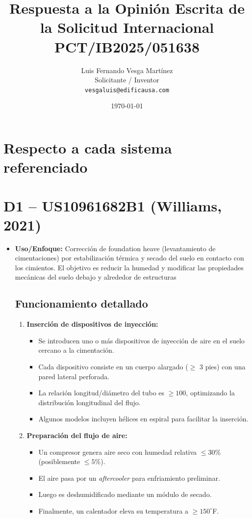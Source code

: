 \documentclass[12pt]{article}
\title{\textbf{Respuesta a la Opinión Escrita de la Solicitud Internacional PCT/IB2025/051638}}
\author{Luis Fernando Vesga Martínez\\Solicitante / Inventor\\\texttt{vesgaluis@edificausa.com}}
\date{\today}
\begin{document}
\maketitle

\section{Respecto a cada sistema referenciado}

\section*{ D1 – US10961682B1 (Williams, 2021)}

\begin{itemize}
    \item \textbf{Uso/Enfoque:} Corrección de foundation heave (levantamiento de cimentaciones) por estabilización térmica y secado del suelo en contacto con los cimientos. El objetivo es reducir la humedad y modificar las propiedades mecánicas del suelo debajo y alrededor de estructuras
    \subsection*{Funcionamiento detallado}

    \begin{enumerate}
        \item \textbf{Inserción de dispositivos de inyección:}
        \begin{itemize}
            \item Se introducen uno o más dispositivos de inyección de aire en el suelo cercano a la cimentación.
            \item Cada dispositivo consiste en un cuerpo alargado (\(\geq\) 3 pies) con una pared lateral perforada.
            \item La relación longitud/diámetro del tubo es \(\geq 100\), optimizando la distribución longitudinal del flujo.
            \item Algunos modelos incluyen hélices en espiral para facilitar la inserción.
        \end{itemize}

        \item \textbf{Preparación del flujo de aire:}
        \begin{itemize}
            \item Un compresor genera aire seco con humedad relativa \(\leq 30\%\) (posiblemente \(\leq 5\%\)).
            \item El aire pasa por un \textit{aftercooler} para enfriamiento preliminar.
            \item Luego es deshumidificado mediante un módulo de secado.
            \item Finalmente, un calentador eleva su temperatura a \(\geq 150^\circ\)F.
        \end{itemize}


\end{enumerate}
\end{itemize}
\end{document}
